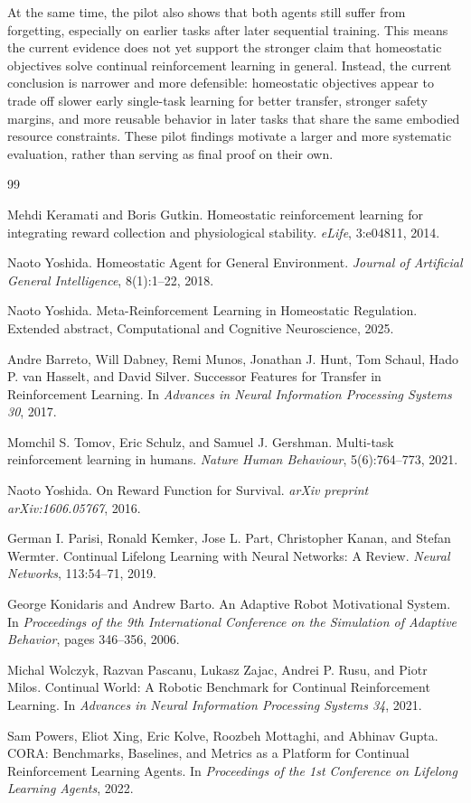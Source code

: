 \documentclass[sigplan,10pt]{acmart}
\begin{document}
At the same time, the pilot also shows that both agents still suffer from forgetting, especially on earlier tasks after later sequential training. This means the current evidence does not yet support the stronger claim that homeostatic objectives solve continual reinforcement learning in general. Instead, the current conclusion is narrower and more defensible: homeostatic objectives appear to trade off slower early single-task learning for better transfer, stronger safety margins, and more reusable behavior in later tasks that share the same embodied resource constraints. These pilot findings motivate a larger and more systematic evaluation, rather than serving as final proof on their own.



 

\begin{thebibliography}{99}
 
Mehdi Keramati and Boris Gutkin. Homeostatic reinforcement learning for integrating reward collection and physiological stability. \emph{eLife}, 3:e04811, 2014.

Naoto Yoshida. Homeostatic Agent for General Environment. \emph{Journal of Artificial General Intelligence}, 8(1):1--22, 2018.

Naoto Yoshida. Meta-Reinforcement Learning in Homeostatic Regulation. Extended abstract, Computational and Cognitive Neuroscience, 2025.

Andre Barreto, Will Dabney, Remi Munos, Jonathan J. Hunt, Tom Schaul, Hado P. van Hasselt, and David Silver. Successor Features for Transfer in Reinforcement Learning. In \emph{Advances in Neural Information Processing Systems 30}, 2017.

Momchil S. Tomov, Eric Schulz, and Samuel J. Gershman. Multi-task reinforcement learning in humans. \emph{Nature Human Behaviour}, 5(6):764--773, 2021.

Naoto Yoshida. On Reward Function for Survival. \emph{arXiv preprint arXiv:1606.05767}, 2016.

German I. Parisi, Ronald Kemker, Jose L. Part, Christopher Kanan, and Stefan Wermter. Continual Lifelong Learning with Neural Networks: A Review. \emph{Neural Networks}, 113:54--71, 2019.

George Konidaris and Andrew Barto. An Adaptive Robot Motivational System. In \emph{Proceedings of the 9th International Conference on the Simulation of Adaptive Behavior}, pages 346--356, 2006.

Michal Wolczyk, Razvan Pascanu, Lukasz Zajac, Andrei P. Rusu, and Piotr Milos. Continual World: A Robotic Benchmark for Continual Reinforcement Learning. In \emph{Advances in Neural Information Processing Systems 34}, 2021.

Sam Powers, Eliot Xing, Eric Kolve, Roozbeh Mottaghi, and Abhinav Gupta. CORA: Benchmarks, Baselines, and Metrics as a Platform for Continual Reinforcement Learning Agents. In \emph{Proceedings of the 1st Conference on Lifelong Learning Agents}, 2022.
\end{thebibliography}
 
\end{document}

